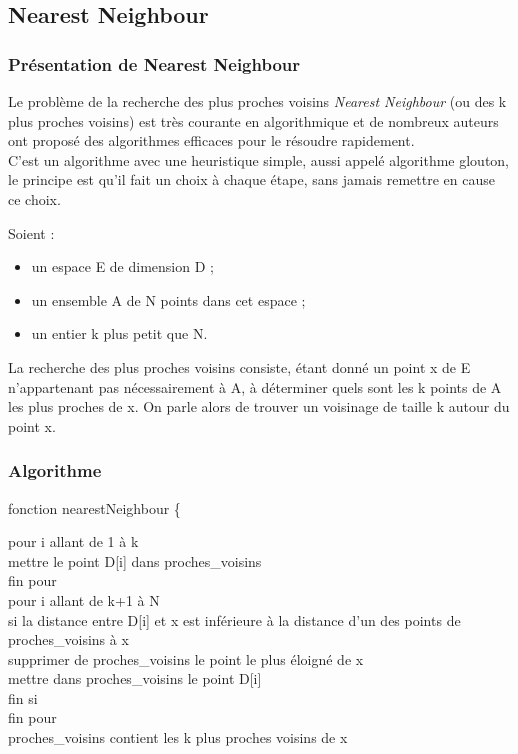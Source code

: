 \documentclass[12pt]{report}
\begin{document}
\subsection{Nearest Neighbour}

\subsubsection{Présentation de Nearest Neighbour}

Le problème de la recherche des plus proches voisins \textit{Nearest Neighbour} (ou des k plus proches voisins) est très courante en algorithmique et de nombreux auteurs ont proposé des algorithmes efficaces pour le résoudre rapidement.\\

C’est un algorithme avec une heuristique simple, aussi appelé algorithme glouton, le principe est qu'il fait un choix à chaque étape, sans jamais remettre en cause ce choix.

Soient :
\begin{itemize}
    \item un espace E de dimension D ;
    \item un ensemble A de N points dans cet espace ;
    \item un entier k plus petit que N.
\end{itemize}
La recherche des plus proches voisins consiste, étant donné un point x de E n'appartenant pas nécessairement à A, à déterminer quels sont les k points de A les plus proches de x. On parle alors de trouver un voisinage de taille k autour du point x.


\subsubsection{Algorithme}

fonction nearestNeighbour \{


\indent pour i allant de 1 à k\\
\indent \indent mettre le point D[i] dans proches\_voisins\\
\indent fin pour\\
\indent pour i allant de k+1 à N\\
\indent \indent si la distance entre D[i] et x est inférieure à la distance d'un des points de proches\_voisins à x\\
\indent \indent \indent supprimer de proches\_voisins le point le plus éloigné de x\\
\indent \indent \indent mettre dans proches\_voisins le point D[i] \\
\indent \indent fin si\\
\indent fin pour\\
\indent proches\_voisins contient les k plus proches voisins de x\\
            
\end{document}
